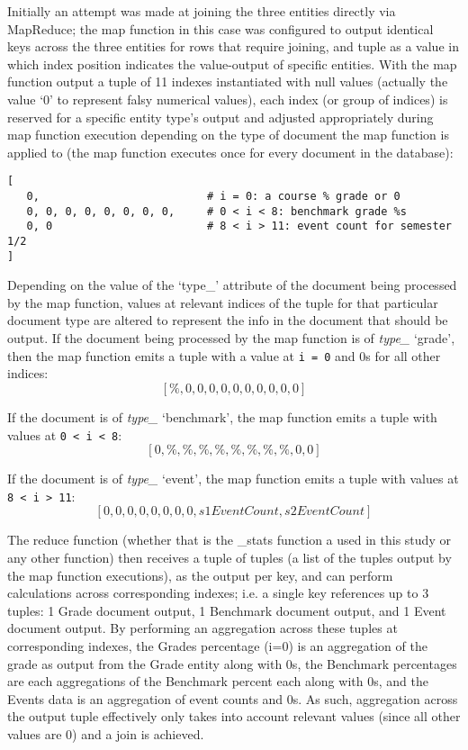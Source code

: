 Initially an attempt was made at joining the three entities directly via MapReduce; the map function in this case was configured to output identical keys across the three entities for rows that require joining, and tuple as a value in which index position indicates the value-output of specific entities. With the map function output a tuple of 11 indexes instantiated with null values (actually the value `0' to represent falsy numerical values), each index (or group of indices) is reserved for a specific entity type's output and adjusted appropriately during map function execution depending on the type of document the map function is applied to (the map function executes once for every document in the database):

\begin{verbatim}
[
   0,                          # i = 0: a course % grade or 0
   0, 0, 0, 0, 0, 0, 0, 0,     # 0 < i < 8: benchmark grade %s
   0, 0                        # 8 < i > 11: event count for semester 1/2
]
\end{verbatim}

Depending on the value of the `type\_' attribute of the document being processed by the map function, values at relevant indices of the tuple for that particular document type are altered to represent the info in the document that should be output. If the document being processed by the map function is of \textit{type\_} ‘grade’, then the map function emits a tuple with a value at \texttt{i = 0} and 0s for all other indices: \[[\%, 0, 0, 0, 0, 0, 0, 0, 0, 0, 0]\]

If the document is of \textit{type\_} `benchmark', the map function emits a tuple with values at \texttt{0 < i < 8}: \[[0, \%, \%, \%, \%, \%, \%, \%, \%, 0, 0]\]

If the document is of \textit{type\_} ‘event’, the map function emits a tuple with values at \texttt{8 < i > 11}: \[[0, 0, 0, 0, 0, 0, 0, 0, s1EventCount, s2EventCount]\]



The reduce function (whether that is the \_stats function a used in this study or any other function) then receives a tuple of tuples (a list of the tuples output by the map function executions), as the output per key, and can perform calculations across corresponding indexes; i.e. a single key references up to 3 tuples: 1 Grade document output, 1 Benchmark document output, and 1 Event document output. By performing an aggregation across these tuples at corresponding indexes, the Grades percentage (i=0) is an aggregation of the grade as output from the Grade entity along with 0s, the Benchmark percentages are each aggregations of the Benchmark percent each along with 0s, and the Events data is an aggregation of event counts and 0s. As such, aggregation across the output tuple effectively only takes into account relevant values (since all other values are 0) and a join is achieved.

